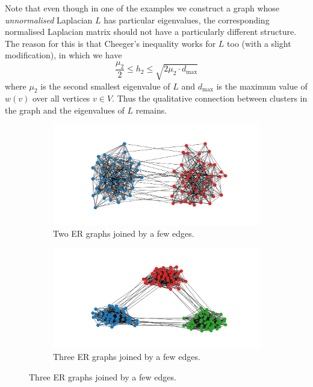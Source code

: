 \documentclass[a4paper,11pt]{article}
\theoremstyle{definition}
\begin{document}
\medskip

Note that even though in one of the examples we construct a graph whose \emph{unnormalised} Laplacian $L$ has particular eigenvalues, the corresponding normalised Laplacian matrix should not have a particularly different structure. The reason for this is that Cheeger's inequality works for $L$ too (with a slight modification), in which we have
\[
\frac{\mu_2}{2} \le h_2 \le \sqrt{2 \mu_2 \cdot d_{\mathrm{max}} }
\] where $\mu_2$ is the second smallest eigenvalue of $L$ and $d_{\mathrm{max}}$ is the maximum value of $w(v)$ over all vertices $v \in V$. Thus the qualitative connection between clusters in the graph and the eigenvalues of $L$ remains.

\begin{figure}
\centering
\begin{subfigure}[b]{0.49\textwidth}
\centering
\includegraphics[width=\textwidth]{two-clustering}
\caption{Two ER graphs joined by a few edges.}
\end{subfigure}
\hfill
\begin{subfigure}[b]{0.49\textwidth}
\centering
\includegraphics[width=\textwidth]{three-clustering}
\caption{Three ER graphs joined by a few edges.}
\end{subfigure}


\end{figure}
\end{document}
